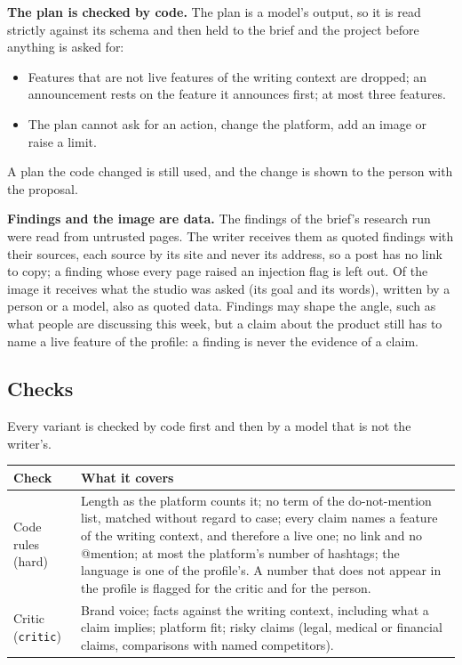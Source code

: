 \documentclass[11pt,a4paper]{article}
\begin{document}
\textbf{The plan is checked by code.} The plan is a model's output, so it is read strictly against its schema and then held to the brief and the project before anything is asked for:
\begin{itemize}
  \item Features that are not live features of the writing context are dropped; an announcement rests on the feature it announces first; at most three features.
  \item The plan cannot ask for an action, change the platform, add an image or raise a limit.
\end{itemize}
A plan the code changed is still used, and the change is shown to the person with the proposal.

\textbf{Findings and the image are data.} The findings of the brief's research run were read from untrusted pages. The writer receives them as quoted findings with their sources, each source by its site and never its address, so a post has no link to copy; a finding whose every page raised an injection flag is left out. Of the image it receives what the studio was asked (its goal and its words), written by a person or a model, also as quoted data. Findings may shape the angle, such as what people are discussing this week, but a claim about the product still has to name a live feature of the profile: a finding is never the evidence of a claim.

\subsection{Checks}
Every variant is checked by code first and then by a model that is not the writer's.

\begin{longtable}{@{}p{4.2cm}p{11.1cm}@{}}
\toprule
\textbf{Check} & \textbf{What it covers}\\
\midrule
\endhead
Code rules (hard) & Length as the platform counts it; no term of the do-not-mention list, matched without regard to case; every claim names a feature of the writing context, and therefore a live one; no link and no @mention; at most the platform's number of hashtags; the language is one of the profile's. A number that does not appear in the profile is flagged for the critic and for the person.\\
Critic (\texttt{critic}) & Brand voice; facts against the writing context, including what a claim implies; platform fit; risky claims (legal, medical or financial claims, comparisons with named competitors).\\
\bottomrule
\end{longtable}
\end{document}
